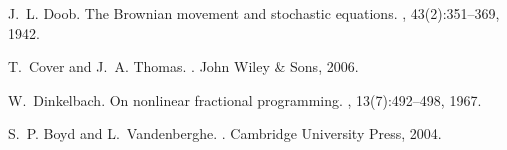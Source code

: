 \documentclass[12pt,journal,onecolumn]{IEEEtran}
\begin{document}
\begin{thebibliography}{10}
J.~L. Doob.
\newblock The {B}rownian movement and stochastic equations.
, 43(2):351--369, 1942.

T.~Cover and J.~A. Thomas.
.
\newblock John Wiley \& Sons, 2006.

W.~Dinkelbach.
\newblock On nonlinear fractional programming.
, 13(7):492--498, 1967.

S.~P. Boyd and L.~Vandenberghe.
.
\newblock Cambridge University Press, 2004.

\end{thebibliography}
\end{document}
